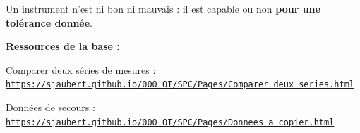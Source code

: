 \documentclass[10pt,a4paper]{article}
\begin{document}
\begin{tcolorbox}[retenir]Un instrument n'est ni bon ni mauvais : il est capable ou non \textbf{pour une tolérance donnée}.\end{tcolorbox}
\vfill{\footnotesize\color{uimm}\textbf{Ressources de la base :}\par Comparer deux séries de mesures : \href{https://sjaubert.github.io/000_OI/SPC/Pages/Comparer_deux_series.html}{\nolinkurl{https://sjaubert.github.io/000_OI/SPC/Pages/Comparer_deux_series.html}}\par Données de secours : \href{https://sjaubert.github.io/000_OI/SPC/Pages/Donnees_a_copier.html\#instr}{\nolinkurl{https://sjaubert.github.io/000_OI/SPC/Pages/Donnees_a_copier.html}}}
\end{document}
